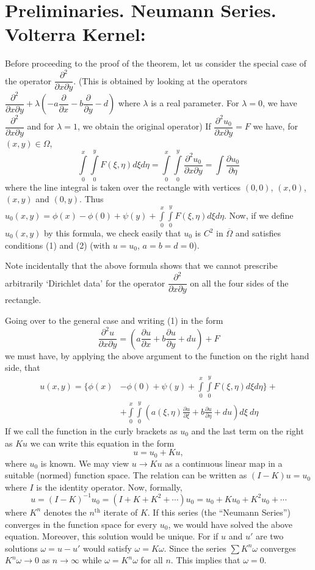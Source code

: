 \section*{Preliminaries. Neumann Series. Volterra Kernel:}\pageoriginale

Before proceeding to the proof of the theorem, let us consider the special case of the operator $\dfrac{\partial^{2}}{\partial x\partial y}$. (This is obtained by looking at the operators $\dfrac{\partial^{2}}{\partial x\partial y}+\lambda\left(-a\dfrac{\partial}{\partial x}-b\dfrac{\partial}{\partial y}-d\right)$ where $\lambda$ is a real parameter. For $\lambda=0$, we have $\dfrac{\partial^{2}}{\partial x\partial y}$ and for $\lambda=1$, we obtain the original operator) If $\dfrac{\partial^{2}u_{0}}{\partial x\partial y}=F$ we have, for $(x,y)\in \Omega$,
$$
\int\limits^{x}_{0}\int\limits^{y}_{0}F(\xi,\eta)d\xi d\eta =\int\limits^{x}_{0}\int\limits^{y}_{0}\dfrac{\partial^{2}u_{0}}{\partial x\partial y}=\int \dfrac{\partial u_{0}}{\partial \eta}
$$
where the line integral is taken over the rectangle with vertices $(0,0)$, $(x,0)$, $(x,y)$ and $(0,y)$. Thus $u_{0}(x,y)=\phi(x)-\phi(0)+\psi(y)+\int\limits^{x}_{0}\int\limits^{y}_{0}F(\xi,\eta)d\xi d\eta$. Now, if we define $u_{0}(x,y)$ by this formula, we check easily that $u_{0}$ is $C^{2}$ in $\overline{\Omega}$ and satisfies conditions (1) and (2) (with $u=u_{0}$, $a=b=d=0$).

Note incidentally that the above formula shows that we cannot prescribe arbitrarily `Dirichlet data' for the operator $\dfrac{\partial^{2}}{\partial x\partial y}$ on all the four sides of the rectangle.

Going over to the general case and writing (1) in the form
$$
\frac{\partial^{2}u}{\partial x \partial y}=\left(a\frac{\partial u}{\partial x}+b\frac{\partial u}{\partial y}+du\right)+F
$$
we must have, by applying the above argument to the function on the right hand side, that
\begin{align*}
u(x,y)=\Big\{ \phi(x) &- \phi(0)+\psi(y)+\int\limits^{x}_{0}\int\limits^{y}_{0}F(\xi,\eta) d\xi d\eta\Big\}+\\[4pt]
& + \int\limits^{x}_{0}\int\limits^{y}_{0}\left(a(\xi,\eta)\frac{\partial u}{\partial \xi}+b\frac{\partial u}{\partial\eta}+du\right)d\xi \ d\eta
\end{align*}
If we call the function in the curly brackets as $u_{0}$ and the last term on the right as $Ku$ we can write this equation in the form
$$
u=u_{0}+Ku,
$$\pageoriginale
where $u_{0}$ is known. We may view $u\to Ku$ as a continuous linear map in a suitable (normed) function space. The relation can be written as
$(I-K)u=u_{0}$ where $I$ is the identity operator. Now, formally,
$$
u=(I-K)^{-1}u_{0}=(I+K+K^{2}+\cdots)u_{0}=u_{0}+Ku_{0}+K^{2}u_{0}+\cdots
$$
where $K^{n}$ denotes the $n^{\text{th}}$ iterate of $K$. If this series (the ``Neumann Series'') converges in the function space for every $u_{0}$, we would have solved the above equation. Moreover, this solution would be unique. For if $u$ and $u'$ are two solutions $\omega=u-u'$ would satisfy $\omega=K\omega$. Since the series $\sum K^{n}\omega$ converges $K^{n}\omega\to 0$ as $n\to \infty$ while $\omega=K^{n}\omega$ for all $n$. This implies that $\omega=0$.

